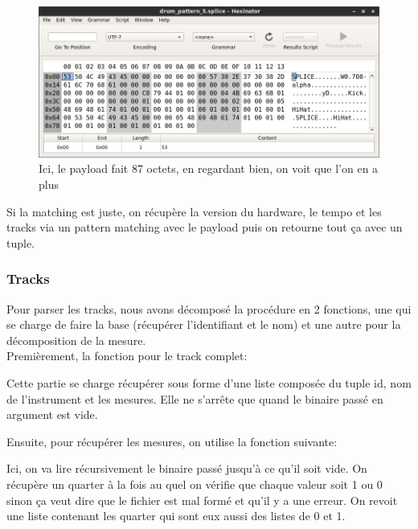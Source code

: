 \documentclass[10pt,a4paper]{article}
\begin{document}
\begin{figure}[ht]
	\includegraphics[scale=0.51]{images/hexa_fail.png}
	\caption{Ici, le payload fait 87 octets, en regardant bien, on voit que l'on en a plus}
\end{figure}

Si la matching est juste, on récupère la version du hardware, le tempo et les tracks via un pattern matching avec le payload puis on retourne tout ça avec un tuple.

\subsubsection{Tracks}
Pour parser les tracks, nous avons décomposé la procédure en 2 fonctions, une qui se charge de faire la base (récupérer l'identifiant et le nom) et une autre pour la décomposition de la mesure.\\

Premièrement, la fonction pour le track complet:



\newpage

Cette partie se charge récupérer sous forme d'une liste composée du tuple id, nom de l'instrument et les mesures. Elle ne s'arrête que quand le binaire passé en argument est vide.

Ensuite, pour récupérer les mesures, on utilise la fonction suivante:



Ici, on va lire récursivement le binaire passé jusqu'à ce qu'il soit vide. On récupère un quarter à la fois au quel on vérifie que chaque valeur soit 1 ou 0 sinon ça veut dire que le fichier est mal formé et qu'il y a une erreur. On revoit une liste contenant les quarter qui sont eux aussi des listes de 0 et 1.
\end{document}
